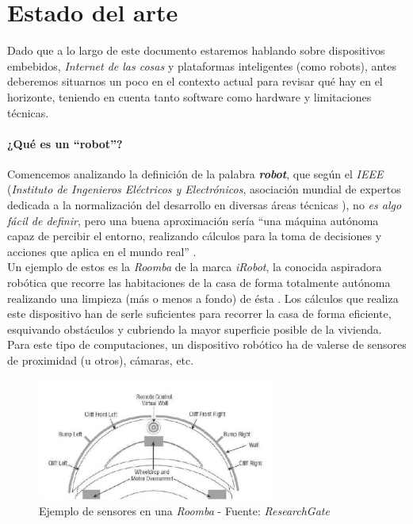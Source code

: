\chapter{Estado del arte}

Dado que a lo largo de este documento estaremos hablando sobre dispositivos embebidos, \textit{Internet de las cosas} y plataformas inteligentes (como robots), antes deberemos situarnos un poco en el contexto actual para revisar qué hay en el horizonte, teniendo en cuenta tanto software como hardware y limitaciones técnicas.\\

\subsubsection{¿Qué es un ``robot''?}

Comencemos analizando la definición de la palabra \textbf{\textit{robot}}, que según el \textit{IEEE} (\textit{Instituto de Ingenieros Eléctricos y Electrónicos}, asociación mundial de expertos dedicada a la normalización del desarrollo en diversas áreas técnicas \cite{ieee}), no \textit{es algo fácil de definir}, pero una buena aproximación sería ``una máquina autónoma capaz de percibir el entorno, realizando cálculos para la toma de decisiones y acciones que aplica en el mundo real'' \cite{whats_a_robot}.\\

Un ejemplo de estos es la \textit{Roomba} de la marca \textit{iRobot}, la conocida aspiradora robótica que recorre las habitaciones de la casa de forma totalmente autónoma realizando una limpieza (más o menos a fondo) de ésta \cite{roomba}. Los cálculos que realiza este dispositivo han de serle suficientes para recorrer la casa de forma eficiente, esquivando obstáculos y cubriendo la mayor superficie posible de la vivienda. Para este tipo de computaciones, un dispositivo robótico ha de valerse de sensores de proximidad (u otros), cámaras, etc.\\

\begin{figure}[h]
	\centering
	\includegraphics[width=0.7\textwidth]{imagenes/irobot-sensors.png}
	\caption{Ejemplo de sensores en una \textit{Roomba} - Fuente: \textit{ResearchGate} \cite{roomba-sensors-rg}}
	\label{irobot-sensors}
\end{figure}

